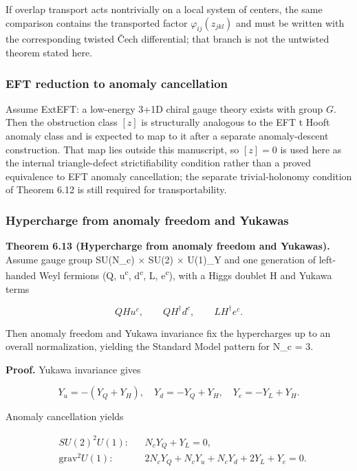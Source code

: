 If overlap transport acts nontrivially on a local system of centers, the same comparison contains
the transported factor \(\varphi_{ij}(z_{jkl})\) and must be written with the corresponding twisted
\v{C}ech differential; that branch is not the untwisted theorem stated here.

\subsubsection{EFT reduction to anomaly cancellation}\label{67-eft-reduction-to-anomaly-cancellation}

Assume ExtEFT: a low-energy 3+1D chiral gauge theory exists with group \(G\). Then the obstruction class \([z]\) is structurally analogous to the EFT \textquotesingle t Hooft anomaly class and is expected to map to it after a separate anomaly-descent construction. That map lies outside this manuscript, so \([z]=0\) is used here as the internal triangle-defect strictifiability condition rather than a proved equivalence to EFT anomaly cancellation; the separate trivial-holonomy condition of Theorem 6.12 is still required for transportability.

\subsubsection{Hypercharge from anomaly freedom and Yukawas}\label{68-hypercharge-from-anomaly-freedom-and-yukawas}

\textbf{Theorem 6.13 (Hypercharge from anomaly freedom and Yukawas).} Assume gauge group SU(N\_c) \ensuremath{\times} SU(2) \ensuremath{\times} U(1)\_Y and one generation of left-handed Weyl fermions (Q, u\textsuperscript{c}, d\textsuperscript{c}, L, e\textsuperscript{c}), with a Higgs doublet H and Yukawa terms

\[
Q H u^c,\qquad Q H^\dagger d^c,\qquad L H^\dagger e^c.
\]

Then anomaly freedom and Yukawa invariance fix the hypercharges up to an overall normalization, yielding the Standard Model pattern for N\_c = 3.

\textbf{Proof.} Yukawa invariance gives

\[
Y_u = -(Y_Q + Y_H),\quad
Y_d = -Y_Q + Y_H,\quad
Y_e = -Y_L + Y_H.
\]

Anomaly cancellation yields

\[
\begin{aligned}
&SU(2)^2 U(1): && N_c Y_Q + Y_L = 0,\\
&\mathrm{grav}^2 U(1): && 2 N_c Y_Q + N_c Y_u + N_c Y_d + 2 Y_L + Y_e = 0.
\end{aligned}
\]

